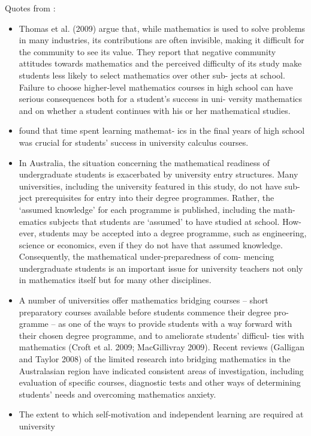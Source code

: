 \documentclass[twoside,12pt,a4paper]{report}
\begin{document}
Quotes from \cite{Gordon2013}:
\begin{itemize}
	\item Thomas et al. (2009) argue that, while mathematics is used to solve
problems in many industries, its contributions are often invisible, making
it difficult for the community to see its value. They report that negative
community attitudes towards mathematics and the perceived difficulty of
its study make students less likely to select mathematics over other sub-
jects at school. Failure to choose higher-level mathematics courses in high
school can have serious consequences both for a student’s success in uni-
versity mathematics and on whether a student continues with his or her
mathematical studies.
	\item \cite{Kajander2005} found that time spent learning mathemat-
ics in the final years of high school was crucial for students’ success in
university calculus courses.
	\item In Australia, the situation concerning the mathematical readiness of
undergraduate students is exacerbated by university entry structures. Many
universities, including the university featured in this study, do not have sub-
ject prerequisites for entry into their degree programmes. Rather, the
‘assumed knowledge’ for each programme is published, including the math-
ematics subjects that students are ‘assumed’ to have studied at school. How-
ever, students may be accepted into a degree programme, such as
engineering, science or economics, even if they do not have that assumed
knowledge. Consequently, the mathematical under-preparedness of com-
mencing undergraduate students is an important issue for university teachers
not only in mathematics itself but for many other disciplines.
	\item A number of universities offer mathematics bridging courses – short
preparatory courses available before students commence their degree pro-
gramme – as one of the ways to provide students with a way forward
with their chosen degree programme, and to ameliorate students’ difficul-
ties with mathematics (Croft et al. 2009; MacGillivray 2009). Recent
reviews (Galligan and Taylor 2008) of the limited research into bridging
mathematics in the Australasian region have indicated consistent areas of
investigation, including evaluation of specific courses, diagnostic tests and
other ways of determining students’ needs and overcoming mathematics
anxiety.
	\item The extent
to which self-motivation and independent learning are required at university

\end{itemize}
\end{document}

